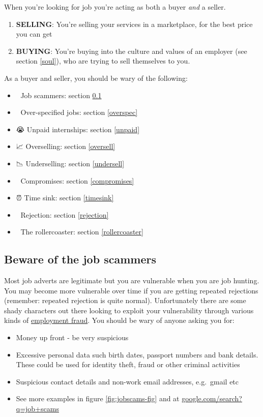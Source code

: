 \documentclass[
]{book}
\providecommand{\tightlist}{%
  \setlength{\itemsep}{0pt}\setlength{\parskip}{0pt}}
\begin{document}
When you're looking for job you're acting as both a buyer \emph{and} a seller.

\begin{enumerate}
\def\labelenumi{\arabic{enumi}.}
\tightlist
\item
  \textbf{SELLING}: You're selling your services in a marketplace, for the best price you can get
\item
  \textbf{BUYING}: You're buying into the culture and values of an employer (see section \ref{soul}), who are trying to sell themselves to you.
\end{enumerate}

As a buyer and seller, you should be wary of the following:

\begin{itemize}
\tightlist
\item
  🤥 Job scammers: section \ref{scams}
\item
  🤣 Over-specified jobs: section \ref{overspec}
\item
  😭 Unpaid internships: section \ref{unpaid}
\item
  📈 Overselling: section \ref{oversell}
\item
  📉 Underselling: section \ref{undersell}
\item
  🤔 Compromises: section \ref{compromises}
\item
  ⏰ Time sink: section \ref{timesink}
\item
  🤮 Rejection: section \ref{rejection}
\item
  🎢 The rollercoaster: section \ref{rollercoaster}
\end{itemize}

\hypertarget{scams}{%
\subsection{Beware of the job scammers}\label{scams}}

Most job adverts are legitimate but you are vulnerable when you are job hunting. You may become more vulnerable over time if you are getting repeated rejections (remember: repeated rejection is quite normal). Unfortunately there are some shady characters out there looking to exploit your vulnerability through various kinds of \href{https://en.wikipedia.org/wiki/Employment_fraud}{employment fraud}. \citep{jobscammers} You should be wary of anyone asking you for:

\begin{itemize}
\tightlist
\item
  Money up front - be very suspicious
\item
  Excessive personal data such birth dates, passport numbers and bank details. These could be used for identity theft, fraud or other criminal activities
\item
  Suspicious contact details and non-work email addresses, e.g.~gmail etc \citep{jobscammers2}
\item
  See more examples in figure \ref{fig:jobscams-fig} and at \href{https://www.google.com/search?q=job+scams}{google.com/search?q=job+scams}
\end{itemize}
\end{document}
